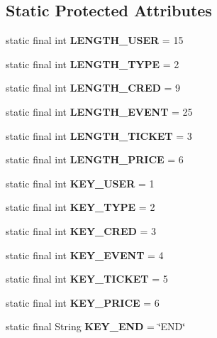 \subsection*{Static Protected Attributes}
\begin{DoxyCompactItemize}
\item 
\mbox{\label{class_handler_abfb4b8c03aa76943e15a476d94b44741}} 
static final int {\bfseries L\+E\+N\+G\+T\+H\+\_\+\+U\+S\+ER} = 15
\item 
\mbox{\label{class_handler_a3f9bfaf65c9bd027e26376764c429da0}} 
static final int {\bfseries L\+E\+N\+G\+T\+H\+\_\+\+T\+Y\+PE} = 2
\item 
\mbox{\label{class_handler_a4122df995abe23067bff9cd83d5e45ca}} 
static final int {\bfseries L\+E\+N\+G\+T\+H\+\_\+\+C\+R\+ED} = 9
\item 
\mbox{\label{class_handler_a4ef2dfee6d27e313b3ba92d7efe2a9fb}} 
static final int {\bfseries L\+E\+N\+G\+T\+H\+\_\+\+E\+V\+E\+NT} = 25
\item 
\mbox{\label{class_handler_ae93869af53aa3fbe3a8c6c44e72024fe}} 
static final int {\bfseries L\+E\+N\+G\+T\+H\+\_\+\+T\+I\+C\+K\+ET} = 3
\item 
\mbox{\label{class_handler_af651a9c166d2a1fe92907d9c20c8cb3c}} 
static final int {\bfseries L\+E\+N\+G\+T\+H\+\_\+\+P\+R\+I\+CE} = 6
\item 
\mbox{\label{class_handler_af8e3692582a86f10572e3c51a51d96ab}} 
static final int {\bfseries K\+E\+Y\+\_\+\+U\+S\+ER} = 1
\item 
\mbox{\label{class_handler_a2c5b46de72e443ed3e42c3e256c95739}} 
static final int {\bfseries K\+E\+Y\+\_\+\+T\+Y\+PE} = 2
\item 
\mbox{\label{class_handler_a1454d5998bf118b9d00d62f19d63f2d8}} 
static final int {\bfseries K\+E\+Y\+\_\+\+C\+R\+ED} = 3
\item 
\mbox{\label{class_handler_a63c355f040a3f99e838003a135dc5265}} 
static final int {\bfseries K\+E\+Y\+\_\+\+E\+V\+E\+NT} = 4
\item 
\mbox{\label{class_handler_a089d51a879f07ed75059ed6af9910636}} 
static final int {\bfseries K\+E\+Y\+\_\+\+T\+I\+C\+K\+ET} = 5
\item 
\mbox{\label{class_handler_a7a62ffdfc06bc6bb136d50b648a68cd3}} 
static final int {\bfseries K\+E\+Y\+\_\+\+P\+R\+I\+CE} = 6
\item 
\mbox{\label{class_handler_ab776366572aa61a50aff6f51199dbb4c}} 
static final String {\bfseries K\+E\+Y\+\_\+\+E\+ND} = \char`\"{}E\+ND\char`\"{}
\end{DoxyCompactItemize}



